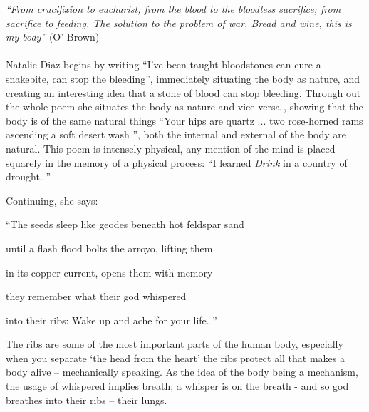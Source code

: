 
\textit{``From crucifixion to eucharist; from the blood to the bloodless sacrifice; from sacrifice to feeding. The solution to the problem of war. Bread and wine, this is my body''} (O' Brown)
\paragraph{}
 Natalie Diaz begins by writing ``I’ve been taught bloodstones can cure a snakebite,
can stop the bleeding'', immediately situating the body as nature, and creating an interesting idea that a stone of blood can stop bleeding. Through out the whole poem she situates the body as nature and vice-versa , showing that the body is of the same natural things ``Your hips are quartz ... two rose-horned rams ascending a soft desert wash '', both the internal and external of the body are natural. This poem is intensely physical, any mention of the mind is placed squarely in the memory of a physical process: ``I learned  \textit{Drink} in a country of drought. '' 

Continuing, she says:

``The seeds sleep like geodes beneath hot feldspar sand

until a flash flood bolts the arroyo, lifting them

in its copper current, opens them with memory–

they remember what their god whispered

into their ribs: Wake up and ache for your life. ''

The ribs are some of the most important parts of the human body, especially when you separate `the head from the heart' the ribs protect all that makes a body alive -- mechanically speaking. As the idea of the body being a mechanism, the usage of whispered implies breath; a whisper is on the breath - and so god breathes into their ribs -- their lungs. 
